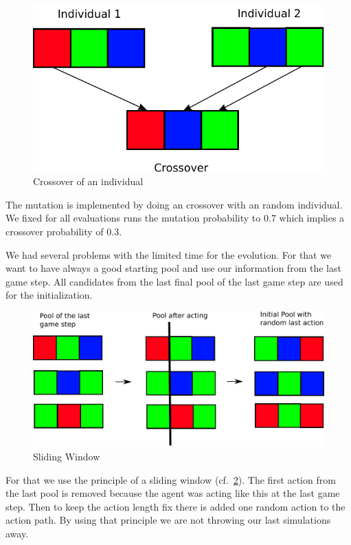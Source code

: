 \begin{figure}[H]
\centering
\includegraphics[scale=0.6]{images/crossover.pdf}
\caption{Crossover of an individual}
\label{fig:crossover}
\end{figure}

The mutation is implemented by doing an crossover with an random individual.
We fixed for all evaluations runs the mutation probability to $0.7$ which implies a crossover 
probability of $0.3$.

We had several problems with the limited time for the evolution.
For that we want to have always a good starting pool and use our information from the last
game step. All candidates from the last final pool of the last game step are used for the initialization.


\begin{figure}[H]
\centering
\includegraphics[scale=0.6]{images/sliding_window.pdf}
\caption{Sliding Window}
\label{fig:sliding_window}
\end{figure}

For that we use the principle of a sliding window (cf.~\cref{fig:sliding_window}). The first
action from the last pool is removed because the agent was acting like this at the last game step. Then
to keep the action length fix there is added one random action to the action path.
By using that principle we are not throwing our last simulations away.

